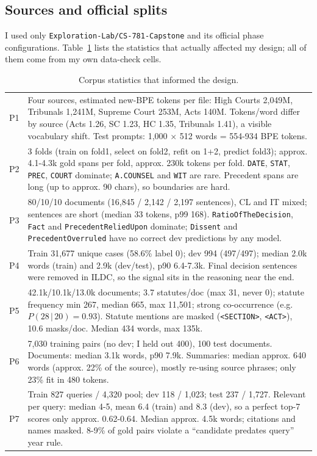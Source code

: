 \documentclass[11pt, oneside]{article}
\begin{document}
\subsection{Sources and official splits}
I used only \texttt{Exploration-Lab/CS-781-Capstone} and its official phase
configurations. Table~\ref{tab:data} lists the statistics that actually affected my design;
all of them come from my own data-check cells.
\begin{table}[t!]
\centering
\small
\caption{Corpus statistics that informed the design.}
\label{tab:data}
\begin{tabular}{p{0.9cm}p{14.6cm}}
\toprule
P1 & Four sources, estimated new-BPE tokens per file: High Courts 2{,}049M, Tribunals 1{,}241M, Supreme Court 253M, Acts 140M. Tokens/word differ by source (Acts 1.26, SC 1.23, HC 1.35, Tribunals 1.41), a visible vocabulary shift. Test prompts: 1{,}000 $\times$ 512 words = 554-934 BPE tokens. \\
P2 & 3 folds (train on fold1, select on fold2, refit on 1+2, predict fold3); approx. 4.1-4.3k gold spans per fold, approx. 230k tokens per fold. \texttt{DATE}, \texttt{STAT}, \texttt{PREC}, \texttt{COURT} dominate; \texttt{A.COUNSEL} and \texttt{WIT} are rare. Precedent spans are long (up to approx. 90 chars), so boundaries are hard. \\
P3 & 80/10/10 documents (16{,}845 / 2{,}142 / 2{,}197 sentences), CL and IT mixed; sentences are short (median 33 tokens, p99 168). \texttt{RatioOfTheDecision}, \texttt{Fact} and \texttt{PrecedentReliedUpon} dominate; \texttt{Dissent} and \texttt{PrecedentOverruled} have no correct dev predictions by any model. \\
P4 & Train 31{,}677 unique cases (58.6\% label 0); dev 994 (497/497); median 2.0k words (train) and 2.9k (dev/test), p90 6.4-7.3k. Final decision sentences were removed in ILDC, so the signal sits in the reasoning near the end. \\
P5 & 42.1k/10.1k/13.0k documents; 3.7 statutes/doc (max 31, never 0); statute frequency min 267, median 665, max 11{,}501; strong co-occurrence (e.g.\ $P(28\,|\,20)=0.93$). Statute mentions are masked (\texttt{<SECTION>}, \texttt{<ACT>}), 10.6 masks/doc. Median 434 words, max 135k. \\
P6 & 7{,}030 training pairs (no dev; I held out 400), 100 test documents. Documents: median 3.1k words, p90 7.9k. Summaries: median approx. 640 words (approx. 22\% of the source), mostly re-using source phrases; only 23\% fit in 480 tokens. \\
P7 & Train 827 queries / 4{,}320 pool; dev 118 / 1{,}023; test 237 / 1{,}727. Relevant per query: median 4-5, mean 6.4 (train) and 8.3 (dev), so a perfect top-7 scores only approx. 0.62-0.64. Median approx. 4.5k words; citations and names masked. 8-9\% of gold pairs violate a ``candidate predates query'' year rule. \\
\bottomrule
\end{tabular}
\end{table}
\end{document}
